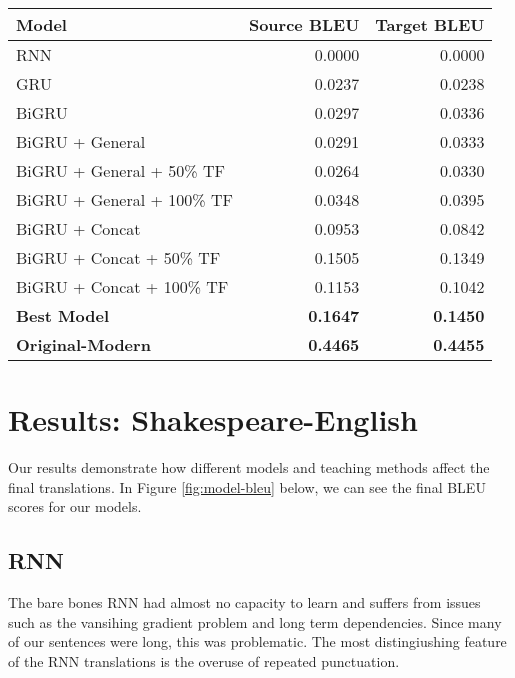 \documentclass[twoside,twocolumn]{article}
\begin{document}
\begin{figure*}
    \centering
    \begin{tabular}{ |l|r|r| }
        \hline
        \textbf{Model}
          & \textbf{Source BLEU} & \textbf{Target BLEU} \\
        \hline
        RNN                             & 0.0000 & 0.0000 \\ \hline
        GRU                             & 0.0237 & 0.0238 \\ \hline
        BiGRU                           & 0.0297 & 0.0336 \\ \hline
        BiGRU + General                 & 0.0291 & 0.0333 \\ \hline
        BiGRU + General + 50\% TF       & 0.0264 & 0.0330 \\ \hline
        BiGRU + General + 100\% TF      & 0.0348 & 0.0395 \\ \hline
        BiGRU + Concat                  & 0.0953 & 0.0842 \\ \hline
        BiGRU + Concat + 50\% TF        & 0.1505 & 0.1349 \\ \hline
        BiGRU + Concat + 100\% TF       & 0.1153 & 0.1042 \\ \hline
        \textbf{Best Model}             & \textbf{0.1647} & \textbf{0.1450} \\ \hline
        \textbf{Original-Modern}  & \textbf{0.4465} & \textbf{0.4455} \\ \hline
    \end{tabular}

    \caption{Model BLEU Results for Experiments. Source BLEU compares results
    to the source (original) sentences. Target BLEU compares results to
    the target (modern) sentences. We aim for high Target BLEUs.}
    \label{fig:model-bleu}
\end{figure*}
\section{Results: Shakespeare-English}
\label{sec:results}
Our results demonstrate how different models and teaching methods affect the
final translations. In Figure \ref{fig:model-bleu} below, we can see the
final BLEU scores for our models.

\subsection{RNN}
The bare bones RNN had almost no capacity to learn and suffers from issues
such as the vansihing gradient problem and long term dependencies. Since many
of our sentences were long, this was problematic. The most distingiushing
feature of the RNN translations is the overuse of repeated punctuation.
\end{document}
